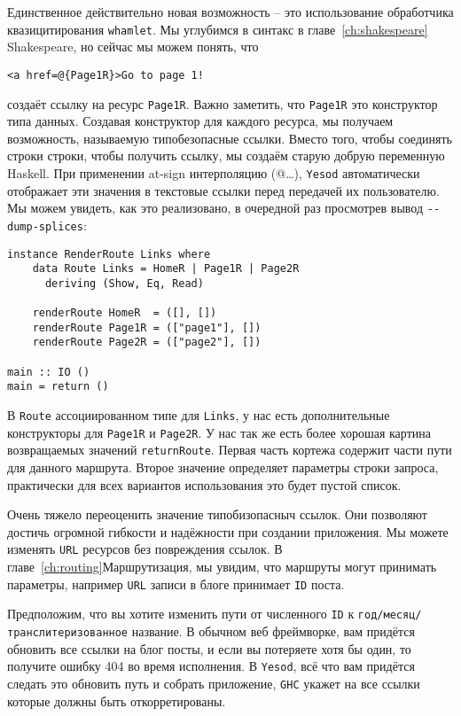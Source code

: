 Единственное действительно новая возможность -- это использование обработчика  
квазицитирования \lstinline'whamlet'. Мы углубимся в синтакс в главе~\ref{ch:shakespeare} Shakespeare, но сейчас мы можем понять, что

\begin{lstlisting}
<a href=@{Page1R}>Go to page 1!
\end{lstlisting}

создаёт ссылку на ресурс \lstinline!Page1R!. Важно заметить, что 
\lstinline!Page1R! это конструктор типа данных. Создавая конструктор 
для каждого ресурса, мы получаем возможность, называемую типобезопасные 
ссылки. Вместо того, чтобы соединять строки строки, чтобы получить ссылку,
 мы создаём старую добрую переменную Haskell.
При применении at-sign интерполяцию (@{\ldots}), \texttt{Yesod}
автоматически отображает эти значения в текстовые ссылки перед 
передачей их пользователю. Мы можем увидеть, как это реализовано, 
в очередной раз просмотрев вывод \lstinline!--dump-splices!:

\begin{lstlisting}
instance RenderRoute Links where
    data Route Links = HomeR | Page1R | Page2R
      deriving (Show, Eq, Read)

    renderRoute HomeR  = ([], [])
    renderRoute Page1R = (["page1"], [])
    renderRoute Page2R = (["page2"], [])

main :: IO ()
main = return ()
\end{lstlisting}

В \lstinline!Route! ассоциированном типе для \lstinline!Links!, у нас 
есть дополнительные конструкторы для \lstinline!Page1R! и 
\lstinline!Page2R!. У нас так же есть более хорошая картина 
возвращаемых значений \lstinline!returnRoute!. Первая часть кортежа 
содержит части пути для данного маршрута. Второе значение определяет
параметры строки запроса, практически для всех вариантов использования это будет пустой список.

Очень тяжело переоценить значение типобизопасныч ссылок. Они позволяют 
достичь огромной гибкости и надёжности при создании приложения. Мы можете 
изменять \texttt{URL} ресурсов без повреждения ссылок. 
В главе~\ref{ch:routing}Маршрутизация, мы увидим, что маршруты могут 
принимать параметры, например \texttt{URL} записи в блоге принимает 
\texttt{ID} поста.

Предположим, что вы хотите изменить пути от численного \texttt{ID} к 
\texttt{год/месяц/транслитеризованное} название. В обычном 
веб фреймворке, вам придётся обновить все ссылки на блог посты, и если вы потеряете хотя бы один, то 
получите ошибку 404 во время исполнения. В \texttt{Yesod}, всё что вам придётся следать это обновить 
путь и собрать приложение, \texttt{GHC} укажет на все ссылки которые должны быть откорретированы.

